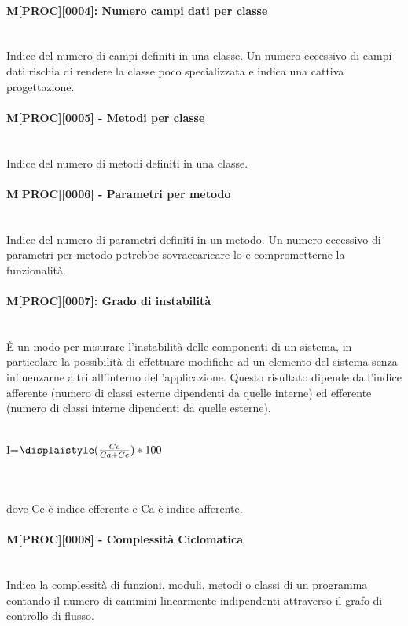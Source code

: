 \paragraph{M[PROC][0004]: Numero campi dati per classe}
~\\Indice del numero di campi definiti in una classe. Un numero eccessivo di campi dati rischia di rendere la classe poco specializzata e indica una cattiva progettazione.

\paragraph{M[PROC][0005] - Metodi per classe}
~\\Indice del numero di metodi definiti in una classe.

\paragraph{M[PROC][0006] - Parametri per metodo}
~\\Indice del numero di parametri definiti in un metodo. Un numero eccessivo di parametri per metodo potrebbe sovraccaricare lo  e comprometterne la funzionalità.

\paragraph{M[PROC][0007]: Grado di instabilità}
~\\È un modo per misurare l'instabilità delle componenti di un sistema, in particolare la possibilità di effettuare modifiche ad un elemento del sistema senza influenzarne altri all'interno dell'applicazione. Questo risultato dipende dall'indice afferente (numero di classi esterne dipendenti da quelle interne) ed efferente (numero di classi interne dipendenti da quelle esterne).
    \\\\
    \centerline{I=${\displaistyle({\frac{Ce}{Ca+Ce}})*100}$}
    \\\\
    dove Ce è indice efferente e Ca è indice afferente.

\paragraph{M[PROC][0008] - Complessità Ciclomatica}
~\\Indica la complessità di funzioni, moduli, metodi o classi di un programma contando il numero di cammini linearmente indipendenti attraverso il grafo di controllo di flusso.

